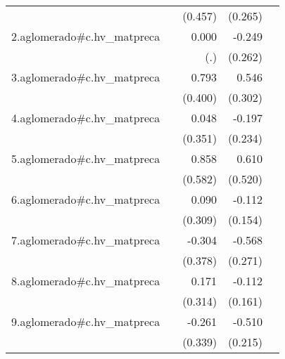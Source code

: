 {\begin{longtable}{l*{4}{D{.}{.}{-1}}}
            &                     &     (0.457)         &     (0.265)         &                     \\
\addlinespace
2.aglomerado#c.hv\_matpreca&                     &       0.000         &      -0.249         &                     \\
            &                     &         (.)         &     (0.262)         &                     \\
\addlinespace
3.aglomerado#c.hv\_matpreca&                     &       0.793\sym{*}  &       0.546         &                     \\
            &                     &     (0.400)         &     (0.302)         &                     \\
\addlinespace
4.aglomerado#c.hv\_matpreca&                     &       0.048         &      -0.197         &                     \\
            &                     &     (0.351)         &     (0.234)         &                     \\
\addlinespace
5.aglomerado#c.hv\_matpreca&                     &       0.858         &       0.610         &                     \\
            &                     &     (0.582)         &     (0.520)         &                     \\
\addlinespace
6.aglomerado#c.hv\_matpreca&                     &       0.090         &      -0.112         &                     \\
            &                     &     (0.309)         &     (0.154)         &                     \\
\addlinespace
7.aglomerado#c.hv\_matpreca&                     &      -0.304         &      -0.568\sym{*}  &                     \\
            &                     &     (0.378)         &     (0.271)         &                     \\
\addlinespace
8.aglomerado#c.hv\_matpreca&                     &       0.171         &      -0.112         &                     \\
            &                     &     (0.314)         &     (0.161)         &                     \\
\addlinespace
9.aglomerado#c.hv\_matpreca&                     &      -0.261         &      -0.510\sym{*}  &                     \\
            &                     &     (0.339)         &     (0.215)         &                     \\

\end{longtable}}
